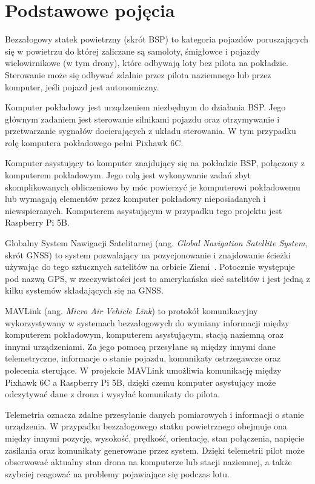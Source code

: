 \documentclass[a4paper,12pt]{book}
\begin{document}
\section{Podstawowe pojęcia}

Bezzałogowy statek powietrzny (skrót BSP) to kategoria pojazdów poruszających się w powietrzu 
do której zaliczane są samoloty, śmigłowce i pojazdy wielowirnikowe (w tym drony), które 
odbywają loty bez pilota na pokładzie. Sterowanie może 
się odbywać zdalnie przez pilota naziemnego lub przez komputer, jeśli pojazd jest \mbox{autonomiczny\cite{web:easa:uavdef}}.

Komputer pokładowy jest urządzeniem niezbędnym do działania BSP. Jego głównym zadaniem jest sterowanie silnikami pojazdu 
oraz otrzymywanie i przetwarzanie sygnałów docierających z układu sterowania. W tym przypadku rolę komputera pokładowego pełni Pixhawk 6C.

Komputer asystujący to komputer znajdujący się na pokładzie BSP, połączony z komputerem pokładowym. Jego rolą jest wykonywanie zadań zbyt 
skomplikowanych obliczeniowo by móc powierzyć je komputerowi pokładowemu lub wymagają elementów przez komputer pokładowy nieposiadanych i niewspieranych. 
Komputerem asystującym w przypadku tego projektu jest Raspberry Pi 5B.

Globalny System Nawigacji Satelitarnej (ang. \textit{Global Navigation Satellite System}, skrót GNSS) to system pozwalający na pozycjonowanie i znajdowanie ścieżki używając do tego 
sztucznych satelitów na orbicie Ziemi~\cite{web:euspa:gnss}. Potocznie występuje pod nazwą GPS, w rzeczywistości jest to amerykańska sieć satelitów i jest jedną z kilku systemów składających się na GNSS.

MAVLink (ang. \textit{Micro Air Vehicle Link}) to protokół komunikacyjny wykorzystywany w systemach bezzałogowych do wymiany informacji między komputerem pokładowym, komputerem asystującym, stacją naziemną oraz 
innymi urządzeniami. Za jego pomocą przesyłane są między innymi dane telemetryczne, informacje o stanie pojazdu, komunikaty ostrzegawcze oraz polecenia sterujące. W projekcie MAVLink umożliwia komunikację 
między Pixhawk 6C a Raspberry Pi 5B, dzięki czemu komputer asystujący może odczytywać dane z drona i wysyłać komunikaty do pilota.

Telemetria oznacza zdalne przesyłanie danych pomiarowych i informacji o stanie urządzenia. W przypadku bezzałogowego statku powietrznego obejmuje ona między innymi pozycję, wysokość, prędkość, orientację, 
stan połączenia, napięcie zasilania oraz komunikaty generowane przez system. Dzięki telemetrii pilot może obserwować aktualny stan drona na komputerze lub stacji naziemnej, a także szybciej reagować 
na problemy pojawiające się podczas lotu.
\end{document}
